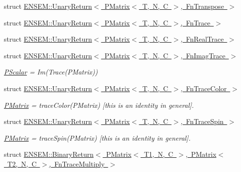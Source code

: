 \begin{DoxyCompactItemize}
\item 
struct \mbox{\hyperlink{structENSEM_1_1UnaryReturn_3_01PMatrix_3_01T_00_01N_00_01C_01_4_00_01FnTranspose_01_4}{E\+N\+S\+E\+M\+::\+Unary\+Return$<$ P\+Matrix$<$ T, N, C $>$, Fn\+Transpose $>$}}
\item 
struct \mbox{\hyperlink{structENSEM_1_1UnaryReturn_3_01PMatrix_3_01T_00_01N_00_01C_01_4_00_01FnTrace_01_4}{E\+N\+S\+E\+M\+::\+Unary\+Return$<$ P\+Matrix$<$ T, N, C $>$, Fn\+Trace $>$}}
\item 
struct \mbox{\hyperlink{structENSEM_1_1UnaryReturn_3_01PMatrix_3_01T_00_01N_00_01C_01_4_00_01FnRealTrace_01_4}{E\+N\+S\+E\+M\+::\+Unary\+Return$<$ P\+Matrix$<$ T, N, C $>$, Fn\+Real\+Trace $>$}}
\item 
struct \mbox{\hyperlink{structENSEM_1_1UnaryReturn_3_01PMatrix_3_01T_00_01N_00_01C_01_4_00_01FnImagTrace_01_4}{E\+N\+S\+E\+M\+::\+Unary\+Return$<$ P\+Matrix$<$ T, N, C $>$, Fn\+Imag\+Trace $>$}}
\begin{DoxyCompactList}\small\item\em \mbox{\hyperlink{classENSEM_1_1PScalar}{P\+Scalar}} = Im(\+Trace(\+P\+Matrix)) \end{DoxyCompactList}\item 
struct \mbox{\hyperlink{structENSEM_1_1UnaryReturn_3_01PMatrix_3_01T_00_01N_00_01C_01_4_00_01FnTraceColor_01_4}{E\+N\+S\+E\+M\+::\+Unary\+Return$<$ P\+Matrix$<$ T, N, C $>$, Fn\+Trace\+Color $>$}}
\begin{DoxyCompactList}\small\item\em \mbox{\hyperlink{classENSEM_1_1PMatrix}{P\+Matrix}} = trace\+Color(\+P\+Matrix) \mbox{[}this is an identity in general\mbox{]}. \end{DoxyCompactList}\item 
struct \mbox{\hyperlink{structENSEM_1_1UnaryReturn_3_01PMatrix_3_01T_00_01N_00_01C_01_4_00_01FnTraceSpin_01_4}{E\+N\+S\+E\+M\+::\+Unary\+Return$<$ P\+Matrix$<$ T, N, C $>$, Fn\+Trace\+Spin $>$}}
\begin{DoxyCompactList}\small\item\em \mbox{\hyperlink{classENSEM_1_1PMatrix}{P\+Matrix}} = trace\+Spin(\+P\+Matrix) \mbox{[}this is an identity in general\mbox{]}. \end{DoxyCompactList}\item 
struct \mbox{\hyperlink{structENSEM_1_1BinaryReturn_3_01PMatrix_3_01T1_00_01N_00_01C_01_4_00_01PMatrix_3_01T2_00_01N_00_1d8da185d9b8e504049f8a2cb304a01d}{E\+N\+S\+E\+M\+::\+Binary\+Return$<$ P\+Matrix$<$ T1, N, C $>$, P\+Matrix$<$ T2, N, C $>$, Fn\+Trace\+Multiply $>$}}

\end{DoxyCompactItemize}
